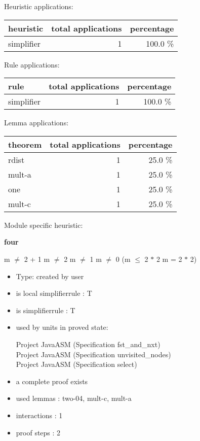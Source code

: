 \documentclass[a4paper]{article}
\begin{document}
\medskip


Heuristic applications:

\begin{supertabular}{l|r|r}
heuristic	& total applications & percentage \\ \hline
simplifier & 1 & 100.0 \% \\

\end{supertabular}

Rule applications:

\begin{supertabular}{l|r|r}
rule	        & total applications & percentage \\ \hline
simplifier & 1 & 100.0 \% \\

\end{supertabular}

Lemma applications:

\begin{supertabular}{l|r|r}
theorem	        & total applications & percentage \\ \hline
rdist & 1 & 25.0 \% \\
mult-a & 1 & 25.0 \% \\
one & 1 & 25.0 \% \\
mult-c & 1 & 25.0 \% \\

\end{supertabular}

Module specific heuristic:

\pagebreak

{\LARGE\bf four}\label{lemma-four}

\medskip

 \Fol m $\neq$ 2 + 1 \And m $\neq$ 2 \And m $\neq$ 1 \And m $\neq$ 0 \Imp (m $\le$ 2 $*$ 2 \Equiv m = 2 $*$ 2)

\begin{itemize}

\item Type: created by user

\item is local simplifierrule : T
\item is simplifierrule : T
\item used by units in proved state:

Project JavaASM (Specification fst\_and\_nxt) \\
Project JavaASM (Specification unvisited\_nodes) \\
Project JavaASM (Specification select)
\item       a complete proof exists
\item       used lemmas  : two-04, mult-c, mult-a
\item       interactions : 1
\item       proof steps  : 2
\end{itemize}
\end{document}
